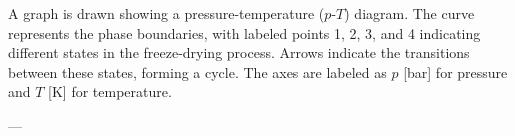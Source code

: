 A graph is drawn showing a pressure-temperature (\( p \)-\( T \)) diagram. The curve represents the phase boundaries, with labeled points 1, 2, 3, and 4 indicating different states in the freeze-drying process. Arrows indicate the transitions between these states, forming a cycle. The axes are labeled as \( p \) [bar] for pressure and \( T \) [K] for temperature.

---